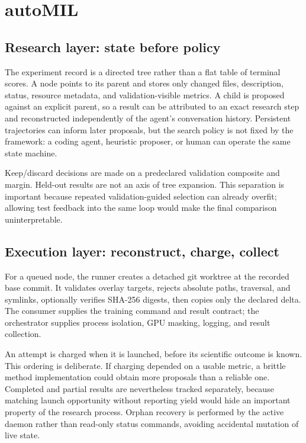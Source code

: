 \documentclass{article}
\newcommand{\ours}{\textsf{autoMIL}\xspace}
\begin{document}
\section{\ours}
\label{sec:system}

\subsection{Research layer: state before policy}

The experiment record is a directed tree rather than a flat table of terminal
scores.  A node points to its parent and stores only changed files, description,
status, resource metadata, and validation-visible metrics.  A child is proposed
against an explicit parent, so a result can be attributed to an exact research
step and reconstructed independently of the agent's conversation history.
Persistent trajectories can inform later proposals, but the search policy is
not fixed by the framework: a coding agent, heuristic proposer, or human can
operate the same state machine.

Keep/discard decisions are made on a predeclared validation composite and
margin.  Held-out results are not an axis of tree expansion.  This separation
is important because repeated validation-guided selection can already overfit;
allowing test feedback into the same loop would make the final comparison
uninterpretable.

\subsection{Execution layer: reconstruct, charge, collect}

For a queued node, the runner creates a detached git worktree at the recorded
base commit.  It validates overlay targets, rejects absolute paths, traversal,
and symlinks, optionally verifies SHA-256 digests, then copies only the
declared delta.  The consumer supplies the training command and result contract;
the orchestrator supplies process isolation, GPU masking, logging, and result
collection.

An attempt is charged when it is launched, before its scientific outcome is
known.  This ordering is deliberate.  If charging depended on a usable metric,
a brittle method implementation could obtain more proposals than a reliable one.
Completed and partial results are nevertheless tracked separately, because
matching launch opportunity without reporting yield would hide an important
property of the research process.  Orphan recovery is performed by the active
daemon rather than read-only status commands, avoiding accidental mutation of
live state.
\end{document}
